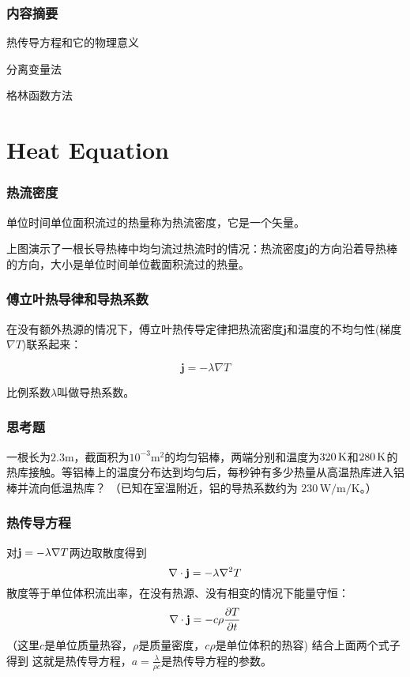\documentclass[CJK]{beamer}
\date{}
\begin{document}
  \bch
{}


\begin{frame}
  \frametitle{内容摘要}
  \bitem
\item{热传导方程和它的物理意义}
\item{分离变量法}  
\item{格林函数方法}
  \eitem
\end{frame}

\section{Heat Equation}


\begin{frame}
  \frametitle{热流密度}
             {\blue 单位时间单位面积流过的热量称为热流密度，它是一个矢量。}



             
             上图演示了一根长导热棒中均匀流过热流时的情况：热流密度$\mathbf{j}$的方向沿着导热棒的方向，大小是单位时间单位截面积流过的热量。



\end{frame}

\begin{frame}
  \frametitle{傅立叶热导律和导热系数}
  在没有额外热源的情况下，{\blue 傅立叶热传导定律}把热流密度$\mathbf{j}$和温度的不均匀性(梯度$\nabla T$)联系起来：

  {\blue $$\mathbf{j} = -\lambda\nabla T$$}

  比例系数$\lambda$叫做{\blue 导热系数}。

\end{frame}


\begin{frame}
  \frametitle{思考题}
  一根长为$2.3\mathrm{m}$，截面积为$10^{-3}\mathrm{m^2}$的均匀铝棒，两端分别和温度为$320\,\mathrm{K}$和$280\,\mathrm{K}$的热库接触。等铝棒上的温度分布达到均匀后，每秒钟有多少热量从高温热库进入铝棒并流向低温热库？
  （已知在室温附近，铝的导热系数约为 $230\,\mathrm{W/m/K}$。）

\end{frame}


\begin{frame}
  \frametitle{热传导方程}
  对${\mathbf{j}} = -\lambda\nabla T$两边取散度得到
  $$\nabla \cdot {\mathbf{j}} = -\lambda \nabla^2T$$
  散度等于单位体积流出率，在没有热源、没有相变的情况下能量守恒：
  $$\nabla\cdot {\mathbf{j}} = -c\rho \frac{\partial T}{\partial t}$$
  （这里$c$是单位质量热容，$\rho$是质量密度，$c\rho$是单位体积的热容)
    结合上面两个式子得到
    这就是{\blue 热传导方程，$a = \frac{\lambda}{\rho c}$是热传导方程的参数。}
\end{frame}
\end{document}
